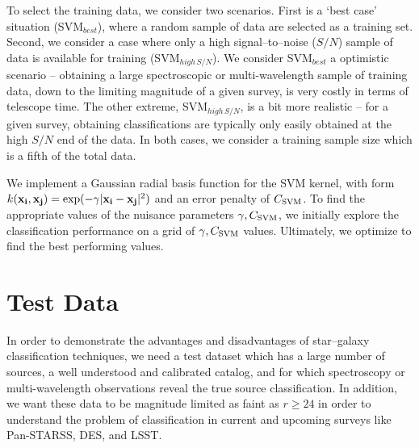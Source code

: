 \documentclass[12pt,preprint]{aastex}
\begin{document}
To select the training data, we consider two scenarios.  First is a `best case' 
situation (SVM$_{best}$), where a random sample of data are selected as a 
training set.  Second, we consider a case where only a high signal--to--noise ($S/N$)
sample of data is available for training (SVM$_{high\,S/N}$).  We consider 
SVM$_{best}$ a optimistic scenario -- obtaining a large spectroscopic 
or multi-wavelength sample of training data, down to the limiting magnitude 
of a given survey, is very costly in terms of telescope time.  The other extreme, 
SVM$_{high\,S/N}$, is a bit more realistic -- for a given survey, obtaining classifications 
are typically only easily obtained at the high $S/N$ end of the data.  In both cases, we 
consider a training sample size which is a fifth of the total data.

We implement a Gaussian radial basis function for the SVM kernel, with 
form $k(\mathbf{x_i},\mathbf{x_j}) = {\rm exp}(-\gamma|\mathbf{x_i}-\mathbf{x_j}|^2)$ 
and an error penalty of $C_{\rm SVM}$.  To find the appropriate values of the nuisance 
parameters $\gamma,C_{\rm SVM}$, we initially explore the classification performance 
on a grid of $\gamma,C_{\rm SVM}$ values.  Ultimately, we optimize to find the best 
performing values.

\section{Test Data}
\label{sec:data}

In order to demonstrate the advantages and disadvantages of 
star--galaxy classification techniques, we need a test dataset 
which has a large number of sources, a well understood and 
calibrated catalog, and for which spectroscopy or multi-wavelength 
observations reveal the true source classification.  In addition, we want 
these data to be magnitude limited as faint as $r\ge24$ in order to 
understand the problem of classification in current and upcoming 
surveys like Pan-STARSS, DES, and LSST.  
\end{document}
